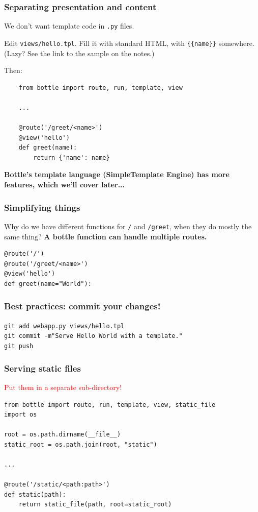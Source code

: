 \documentclass{beamer}
\begin{document}
\begin{frame}[fragile]
  \frametitle{Separating presentation and content}
  We don't want template code in \texttt{.py} files.

  Edit \texttt{views/hello.tpl}. Fill it with standard HTML, with
  \texttt{\{\{name\}\}} somewhere. (Lazy? See the link to the sample
  on the notes.)

  Then:
  \begin{verbatim}
    from bottle import route, run, template, view

    ...

    @route('/greet/<name>')
    @view('hello')
    def greet(name):
    	return {'name': name}
  \end{verbatim}

  \textbf{Bottle's template language (SimpleTemplate Engine) has more
    features, which we'll cover later...}
\end{frame}

\begin{frame}[fragile]
  \frametitle{Simplifying things}
  Why do we have different functions for \texttt{/} and \texttt{/greet}, when they do
  mostly the same thing? \textbf{A bottle function can handle multiple
  routes.}

  \begin{verbatim}
@route('/')
@route('/greet/<name>')
@view('hello')
def greet(name="World"):
  \end{verbatim}
\end{frame}

\begin{frame}
\frametitle{Best practices: commit your changes!}
\texttt{git add webapp.py views/hello.tpl}\\
\texttt{git commit -m"Serve Hello World with a template."}\\
\texttt{git push}
\end{frame}


\begin{frame}[fragile]
  \frametitle{Serving static files}
  \textcolor{red}{\large Put them in a separate sub-directory!}

  \begin{verbatim}
from bottle import route, run, template, view, static_file
import os

root = os.path.dirname(__file__)
static_root = os.path.join(root, "static")

...

@route('/static/<path:path>')
def static(path):
    return static_file(path, root=static_root)
    \end{verbatim}
\end{frame}
\end{document}
